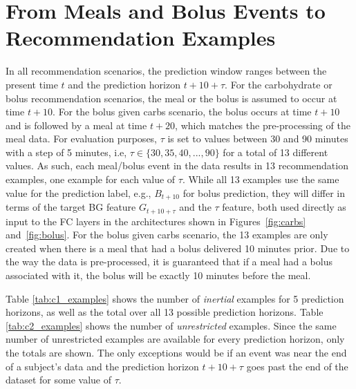 \section{From Meals and Bolus Events to Recommendation Examples}
\label{sec:examples}

In all recommendation scenarios, the prediction window ranges between the present time $t$ and the prediction horizon $t + 10 + \tau$. For the carbohydrate or bolus recommendation scenarios, the meal or the bolus is assumed to occur at time $t +10$. For the bolus given carbs scenario, the bolus occurs at time $t+10$ and is followed by a meal at time $t+20$, which matches the pre-processing of the meal data. For evaluation purposes, $\tau$ is set to values between 30 and 90 minutes with a step of 5 minutes, i.e, $\tau \in \{30, 35, 40, ..., 90\}$ for a total of 13 different values. As such, each meal/bolus event in the data results in 13 recommendation examples, one example for each value of $\tau$. While all 13 examples use the same value for the prediction label, e.g., $B_{t + 10}$ for bolus prediction, they will differ in terms of the target \ac{BG} feature $G_{t + 10 + \tau}$ and the $\tau$ feature, both used directly as input to the FC layers in the architectures shown in Figures~\ref{fig:carbs} and~\ref{fig:bolus}. For the bolus given carbs scenario, the 13 examples are only created when there is a meal that had a bolus delivered 10 minutes prior. Due to the way the data is pre-processed, it is guaranteed that if a meal had a bolus associated with it, the bolus will be exactly 10 minutes before the meal. 

Table \ref{tab:c1_examples} shows the number of {\it inertial} examples for 5 prediction horizons, as well as the total over all 13 possible prediction horizons. Table \ref{tab:c2_examples} shows the number of {\it unrestricted} examples. Since the same number of unrestricted examples are available for every prediction horizon, only the totals are shown. The only exceptions would be if an event was near the end of a subject's data and the prediction horizon $t+10+\tau$ goes past the end of the dataset for some value of $\tau$.

